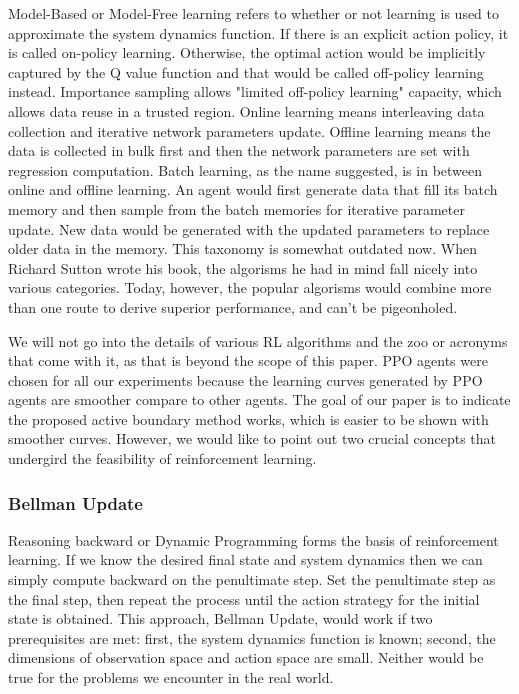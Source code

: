 \documentclass[journal]{IEEEtran}
\begin{document}
Model-Based or Model-Free learning refers to whether or not learning is used to approximate the system dynamics function. If there is an explicit action policy, it is called on-policy learning. Otherwise, the optimal action would be implicitly captured by the Q value function and that would be called off-policy learning instead. Importance sampling allows "limited off-policy learning" capacity, which allows data reuse in a trusted region. Online learning means interleaving data collection and iterative network parameters update. Offline learning means the data is collected in bulk first and then the network parameters are set with regression computation. Batch learning, as the name suggested, is in between online and offline learning. An agent would first generate data that fill its batch memory and then sample from the batch memories for iterative parameter update. New data would be generated with the updated parameters to replace older data in the memory. This taxonomy is somewhat outdated now. When Richard Sutton wrote his book, the algorisms he had in mind fall nicely into various categories. Today, however, the popular algorisms would combine more than one route to derive superior performance, and can't be pigeonholed.

We will not go into the details of various RL algorithms and the zoo or acronyms that come with it, as that is beyond the scope of this paper. PPO agents were chosen for all our experiments because the learning curves generated by PPO agents are smoother compare to other agents. The goal of our paper is to indicate the proposed active boundary method works, which is easier to be shown with smoother curves. However, we would like to point out two crucial concepts that undergird the feasibility of reinforcement learning.

\subsubsection{Bellman Update}

Reasoning backward or Dynamic Programming forms the basis of reinforcement learning. If we know the desired final state and system dynamics then we can simply compute backward on the penultimate step. Set the penultimate step as the final step, then repeat the process until the action strategy for the initial state is obtained. This approach, Bellman Update, would work if two prerequisites are met: first, the system dynamics function is known; second, the dimensions of observation space and action space are small. Neither would be true for the problems we encounter in the real world.
\end{document}

